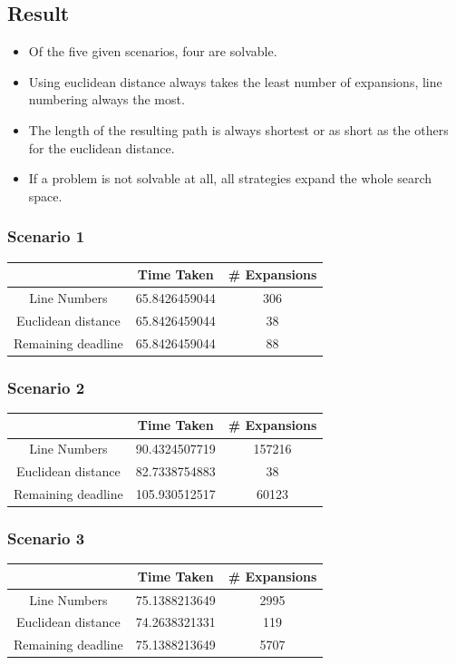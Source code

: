 \documentclass[paper=a4, fontsize=11pt]{scrartcl} %
\numberwithin{equation}{section} %
\numberwithin{figure}{section} %
\numberwithin{table}{section} %
\begin{document}
\subsection{Result}
\begin{itemize}
\item Of the five given scenarios, four are solvable.
\item Using euclidean distance always takes the least number of expansions, line numbering always the most.
\item The length of the resulting path is always shortest or as short as the others for the euclidean distance.
\item If a problem is not solvable at all, all strategies expand the whole search space.
\end{itemize}

\subsubsection{Scenario 1}
\begin{tabular}{|c|c|c|}
\hline 
 & Time Taken & \# Expansions \\ 
\hline 
Line Numbers & 65.8426459044 & 306 \\ 
\hline 
Euclidean distance & 65.8426459044 & 38 \\ 
\hline 
Remaining deadline & 65.8426459044 & 88 \\ 
\hline 
\end{tabular} 


\subsubsection{Scenario 2}
\begin{tabular}{|c|c|c|}
\hline 
 & Time Taken & \# Expansions \\ 
\hline 
Line Numbers & 90.4324507719 & 157216 \\ 
\hline 
Euclidean distance & 82.7338754883 & 38 \\ 
\hline 
Remaining deadline & 105.930512517 & 60123 \\ 
\hline 
\end{tabular} 


\subsubsection{Scenario 3}
\begin{tabular}{|c|c|c|}
\hline 
 & Time Taken & \# Expansions \\ 
\hline 
Line Numbers & 75.1388213649 & 2995 \\ 
\hline 
Euclidean distance & 74.2638321331 & 119 \\ 
\hline 
Remaining deadline & 75.1388213649 & 5707 \\ 
\hline 
\end{tabular} 
\end{document}
